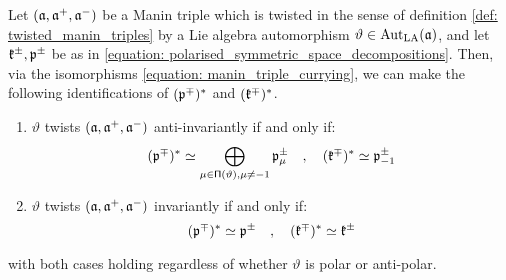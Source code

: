        \begin{lemma} \label{lemma: manin_triple_twists_and_duality}
            Let $(\mathfrak{a}, \mathfrak{a}^+, \mathfrak{a}^-)$ be a Manin triple which is twisted in the sense of definition \ref{def: twisted_manin_triples} by a Lie algebra automorphism $\vartheta \in \operatorname{Aut}_{\mathrm{LA}}(\mathfrak{a})$, and let $\mathfrak{k}^{\pm}, \mathfrak{p}^{\pm}$ be as in \eqref{equation: polarised_symmetric_space_decompositions}. Then, via the isomorphisms \eqref{equation: manin_triple_currying}, we can make the following identifications of $(\mathfrak{p}^{\mp})^*$ and $(\mathfrak{k}^{\mp})^*$.
            \begin{enumerate}
                \item $\vartheta$ twists $(\mathfrak{a}, \mathfrak{a}^+, \mathfrak{a}^-)$ anti-invariantly if and only if:
                    \begin{equation} \label{equation: anti_invariant_twist_duality}
                        (\mathfrak{p}^{\mp})^* \simeq \bigoplus_{ \mu \in \mathsf{\Pi}(\vartheta), \mu \not = -1 } \mathfrak{p}_{\mu}^{\pm} \quad, \quad (\mathfrak{k}^{\mp})^* \simeq \mathfrak{p}_{-1}^{\pm}
                    \end{equation}
                \item $\vartheta$ twists $(\mathfrak{a}, \mathfrak{a}^+, \mathfrak{a}^-)$ invariantly if and only if:
                    \begin{equation} \label{equation: invariant_twist_duality}
                        (\mathfrak{p}^{\mp})^* \simeq \mathfrak{p}^{\pm} \quad, \quad (\mathfrak{k}^{\mp})^* \simeq \mathfrak{k}^{\pm}
                    \end{equation}
            \end{enumerate}
            with both cases holding regardless of whether $\vartheta$ is polar or anti-polar.
        \end{lemma}
